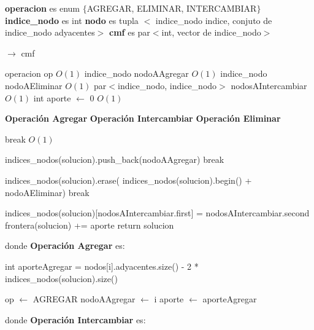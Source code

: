 \documentclass[a4paper, 10pt, twoside]{article}
\newenvironment{pseudo}[1][]{%
    \vspace{1em}%
    \begin{algorithmic}%
}
{%
    \end{algorithmic}%
    \vspace{1em}%
}
\newcommand{\Ode}[1]{\hfill $O(#1)$}
\begin{document}
\begin{pseudo}

\State \textbf{operacion} es enum $\lbrace$AGREGAR, ELIMINAR, INTERCAMBIAR$\rbrace$
\State \textbf{indice\_nodo} es int
\State \textbf{nodo} es tupla $<$ indice\_nodo indice, conjuto de indice\_nodo adyacentes$>$
\State \textbf{cmf} es par$<$int, vector de indice\_nodo$>$

\State
{} $\rightarrow$ cmf
	
	\State operacion op 																		\Ode{1}
	\State indice\_nodo nodoAAgregar															\Ode{1}
	\State indice\_nodo nodoAEliminar															\Ode{1}
	\State par$<$indice\_nodo, indice\_nodo$>$ nodosAIntercambiar								\Ode{1}
	\State int aporte $\leftarrow$ 0															\Ode{1}

	\State
	\State \textbf{Operación Agregar}
	\State
	\State \textbf{Operación Intercambiar}
	\State
	\State \textbf{Operación Eliminar}
	\State

	 break \EndIf																\Ode{1}

		    \State indices\_nodos(solucion).push\_back(nodoAAgregar)
		    \State break
	    \EndCase

		    \State indices\_nodos(solucion).erase(
		    \State indices\_nodos(solucion).begin() + nodoAEliminar)
		    \State break
	    \EndCase

		    \State indices\_nodos(solucion)[nodosAIntercambiar.first] = nodosAIntercambiar.second
	    \EndCase
	\EndSwitch
	\State
	\State frontera(solucion) += aporte
	\State return solucion

\EndProcedure
\State
\State donde \textbf{Operación Agregar} es:
\State

				\State int aporteAgregar = nodos[i].adyacentes.size() - 2 * indices\_nodos(solucion).size()

					\State op $\leftarrow$ AGREGAR
					\State nodoAAgregar $\leftarrow$ i
					\State aporte $\leftarrow$ aporteAgregar
				\EndIf
			\EndIf
		\EndFor

\State
\State donde \textbf{Operación Intercambiar} es:
\State



\end{pseudo}
\end{document}
